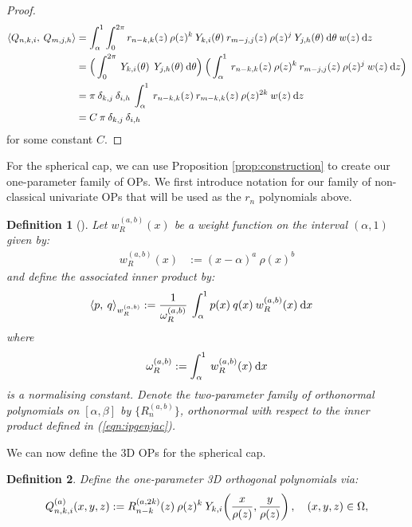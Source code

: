 \documentclass[11pt, oneside]{article}   	%
\newcommand{\genjac}{R}
\newcommand{\genjacnmk}{\genjac_{n-k}}
\newcommand{\genjacw}{w_\genjac}
\newcommand{\normgenjac}{\omega_\genjac}
\newcommand{\scop}{Q}
\newcommand{\scopnki}{\scop_{n,k,i}}
\newcommand{\scopmjh}{\scop_{m,j,h}}
\newcommand{\scopnkia}{\scopnki^{(a)}}
\newcommand{\ch}{Y}
\newcommand{\chki}{\ch_{k,i}}
\newtheorem{definition}{Definition}
\begin{document}
\begin{proof}
\begin{align*}
	\ip< \scopnki, \: \scopmjh > &= \int_\alpha^1 \int_0^{2\pi} r_{n-k,k}(z) \: \rho(z)^k \: \ch_{k,i}(\theta) \: r_{m-j,j}(z) \: \rho(z)^j \: \ch_{j,h}(\theta) \: \D \theta \: w(z) \: \D z \\
	&= \Big(\int_0^{2\pi}  \: \ch_{k,i}(\theta) \: \: \ch_{j,h}(\theta) \: \D \theta \Big) \: \Big( \int_\alpha^1 \: r_{n-k,k}(z) \: \rho(z)^k \: r_{m-j,j}(z) \: \rho(z)^j \: w(z) \: \D z \Big) \\
	&= \pi \: \delta_{k,j} \: \delta_{i,h} \:  \int_\alpha^1 \: r_{n-k,k}(z) \: r_{m-k,k}(z) \: \rho(z)^{2k} \: w(z) \: \D z \\
	&= C \: \pi \: \delta_{k,j} \: \delta_{i,h}
\end{align*}
for some constant $C$.
\end{proof}

For the spherical cap, we can use Proposition \ref{prop:construction} to create our one-parameter family of OPs. We first introduce notation for our family of non-classical univariate OPs that will be used as the $r_n$ polynomials above.
\begin{definition}[\cite{snowball2019sparse}]\label{def:OPconstruction}
Let $\genjacw^{(a,b)}(x)$ be a weight function on the interval $(\alpha, 1)$ given by:
\begin{align*}
	\genjacw^{(a,b)}(x) &:= (x - \alpha)^{a} \: \rho(x)^{b}
\end{align*}
and define the associated inner product by:
\begin{align}
	\ip< p, \: q >_{\genjacw^{(a,b)}} &:= \frac{1}{\normgenjac^{(a,b)}} \: \int_\alpha^1 p(x) \: q(x) \: \genjacw^{(a,b)}(x) \: \D x \label{eqn:ipgenjac}
\end{align}
where
\begin{align}
	\normgenjac^{(a,b)} := \int_\alpha^1 \: \genjacw^{(a,b)}(x) \: \D x \label{eqn:ipnormalisation}
\end{align}
is a normalising constant.
Denote the two-parameter family of orthonormal polynomials on $[\alpha,\beta]$ by $\{\genjac_n^{(a,b)}\}$, orthonormal with respect to the inner product defined in (\ref{eqn:ipgenjac}).
\end{definition}

We can now define the 3D OPs for the spherical cap.
\begin{definition}\label{def:constuction}
Define the one-parameter 3D orthogonal polynomials via:
\begin{align}
	\scopnkia(x,y,z) := \genjacnmk^{(a,2k)}(z) \: \rho(z)^k \: \chki\fpr(\frac{x}{\rho(z)}, \frac{y}{\rho(z)}), \quad (x,y,z) \in \Omega, 
\end{align}
\end{definition}
\end{document}
